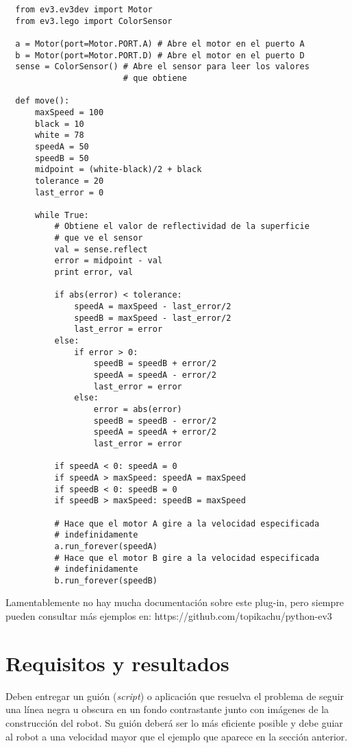 \begin{verbatim}
  from ev3.ev3dev import Motor
  from ev3.lego import ColorSensor

  a = Motor(port=Motor.PORT.A) # Abre el motor en el puerto A
  b = Motor(port=Motor.PORT.D) # Abre el motor en el puerto D
  sense = ColorSensor() # Abre el sensor para leer los valores
                        # que obtiene

  def move():
      maxSpeed = 100
      black = 10
      white = 78
      speedA = 50
      speedB = 50
      midpoint = (white-black)/2 + black
      tolerance = 20
      last_error = 0

      while True:
          # Obtiene el valor de reflectividad de la superficie
          # que ve el sensor
          val = sense.reflect 
          error = midpoint - val
          print error, val

          if abs(error) < tolerance:
              speedA = maxSpeed - last_error/2
              speedB = maxSpeed - last_error/2
              last_error = error
          else:
              if error > 0:
                  speedB = speedB + error/2
                  speedA = speedA - error/2
                  last_error = error
              else:
                  error = abs(error)
                  speedB = speedB - error/2
                  speedA = speedA + error/2
                  last_error = error

          if speedA < 0: speedA = 0
          if speedA > maxSpeed: speedA = maxSpeed
          if speedB < 0: speedB = 0
          if speedB > maxSpeed: speedB = maxSpeed

          # Hace que el motor A gire a la velocidad especificada
          # indefinidamente
          a.run_forever(speedA) 
          # Hace que el motor B gire a la velocidad especificada
          # indefinidamente
          b.run_forever(speedB) 
\end{verbatim}

Lamentablemente no hay mucha documentación sobre este plug-in, pero siempre pueden consultar más ejemplos en: https://github.com/topikachu/python-ev3

\section{Requisitos y resultados}

Deben entregar un guión (\textit{script}) o aplicación que resuelva el problema de seguir una línea negra u obscura en un fondo contrastante junto con imágenes de la construcción del robot. Su guión deberá ser lo más eficiente posible y debe guiar al robot a una velocidad mayor que el ejemplo que aparece en la sección anterior.



